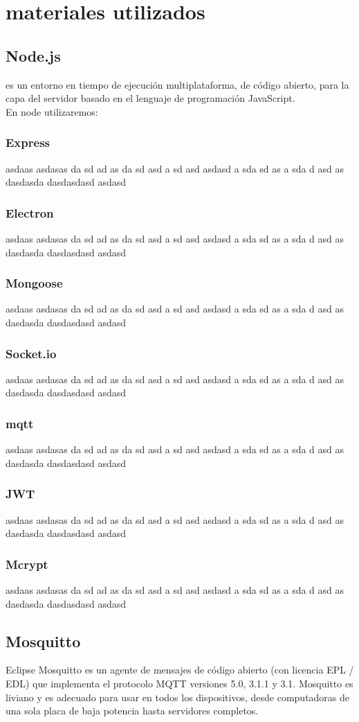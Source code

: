 \section{materiales utilizados}
\subsection{Node.js}
es un entorno en tiempo de ejecución multiplataforma, de código abierto, para la capa del servidor basado en el lenguaje de programación JavaScript.\\
En node utilizaremos:
\subsubsection{Express}
asdaas asdasas da sd ad as da sd asd a sd asd asdasd a sda sd as a sda d asd as dasdasda dasdasdasd asdasd
\subsubsection{Electron}
asdaas asdasas da sd ad as da sd asd a sd asd asdasd a sda sd as a sda d asd as dasdasda dasdasdasd asdasd
\subsubsection{Mongoose}
asdaas asdasas da sd ad as da sd asd a sd asd asdasd a sda sd as a sda d asd as dasdasda dasdasdasd asdasd
\subsubsection{Socket.io}
asdaas asdasas da sd ad as da sd asd a sd asd asdasd a sda sd as a sda d asd as dasdasda dasdasdasd asdasd
\subsubsection{mqtt}
asdaas asdasas da sd ad as da sd asd a sd asd asdasd a sda sd as a sda d asd as dasdasda dasdasdasd asdasd
\subsubsection{JWT}
asdaas asdasas da sd ad as da sd asd a sd asd asdasd a sda sd as a sda d asd as dasdasda dasdasdasd asdasd
\subsubsection{Mcrypt}
asdaas asdasas da sd ad as da sd asd a sd asd asdasd a sda sd as a sda d asd as dasdasda dasdasdasd asdasd
\subsection{Mosquitto}
Eclipse Mosquitto es un agente de mensajes de código abierto (con licencia EPL / EDL) que implementa el protocolo MQTT versiones 5.0, 3.1.1 y 3.1. Mosquitto es liviano y es adecuado para usar en todos los dispositivos, desde computadoras de una sola placa de baja potencia hasta servidores completos.
